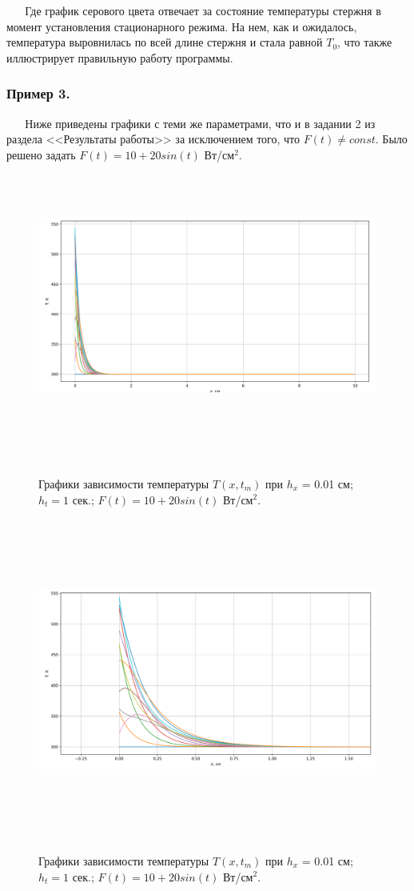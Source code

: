 \documentclass[a4paper,12pt]{article}
\begin{document}
 
 	\linebreak Где график серового цвета отвечает за состояние температуры стержня в момент установления стационарного режима. На нем, как и ожидалось, температура выровнилась по всей длине стержня и стала равной $T_0$, что также иллюстрирует правильную работу программы.
 
 	\newpage
 	
 	\subsubsection*{Пример 3.}
 	
 	Ниже приведены графики с теми же параметрами, что и в задании 2 из раздела <<Результаты работы>> за исключением того, что $F(t) \neq const$. Было решено задать $F(t) = 10 + 20 sin(t)$ Вт/см$^2$.
 	
 	\begin{figure}[h!]
 		\begin{center}
 			{\includegraphics[scale = 0.4]{5.png}}
 			\label{ris:5}
 		\end{center}
 		\caption{Графики зависимости температуры $T(x, t_m)$ при $h_x$ = 0.01 см; $h_t = 1$ сек.; $F(t) = 10 + 20 sin(t)$ Вт/см$^2$.}
 	\end{figure}
 
 	\newpage
 	
 	\begin{figure}[h!]
 		\begin{center}
 			{\includegraphics[scale = 0.4]{7.png}}
 			\label{ris:7}
 		\end{center}
 		\caption{Графики зависимости температуры $T(x, t_m)$ при $h_x$ = 0.01 см; $h_t = 1$ сек.; $F(t) = 10 + 20 sin(t)$ Вт/см$^2$.}
 	\end{figure}
\end{document}
